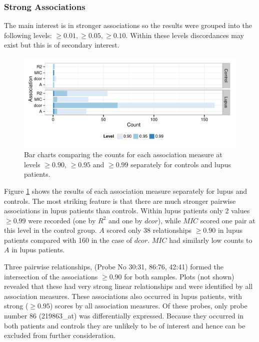 \documentclass[a4paper, 12pt]{report}
\begin{document}
\subsubsection{Strong Associations}
The main interest is in stronger associations so the results were grouped into the following levels: $\ge 0.01, \ge 0.05, \ge 0.10$. Within these levels discordances may exist but this is of secondary interest.

\begin{figure}[H]
\begin{centering}
\includegraphics[width=\textwidth]{associationLevels.pdf}
\caption{Bar charts comparing the counts for each association measure at levels $\ge 0.90$, $\ge 0.95$ and $\ge 0.99$ separately for controls and lupus patients.} 
\label{F:levels}
\end{centering}
\end{figure}

Figure \ref{F:levels} shows the results of each association measure separately for lupus and controls. The most striking feature is that there are much stronger pairwise associations in lupus patients than controls. Within lupus patients only 2 values $\ge 0.99$ were recorded (one by $R^2$ and one by $dcor$), while $MIC$ scored one pair at this level in the control group. $A$ scored only 38 relationships $\ge 0.90$ in lupus patients compared with 160 in the case of $dcor$. $MIC$ had similarly low counts to $A$ in lupus patients.

Three pairwise relationships, (Probe No 30:31, 86:76, 42:41) formed the intersection of the associations $\ge 0.90$ for both samples. Plots (not shown) revealed that these had very strong linear relationships and were identified by all association measures. These associations also occurred in lupus patients, with strong ($\ge 0.95$) scores by all association measures. Of these probes, only probe number 86 (219863\_at) was differentially expressed. Because they occurred in both patients and controls they are unlikely to be of interest and hence can be excluded from further consideration. 
\end{document}
